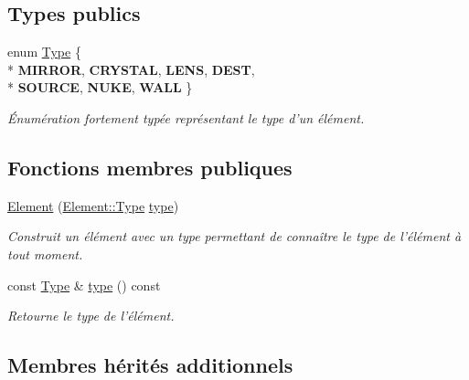 \subsection*{Types publics}
\begin{DoxyCompactItemize}
\item 
\hypertarget{classElement_a009a3be4c3a037a72e292b2464c9cbc5}{enum \hyperlink{classElement_a009a3be4c3a037a72e292b2464c9cbc5}{Type} \{ \\*
{\bfseries M\+I\+R\+R\+O\+R}, 
{\bfseries C\+R\+Y\+S\+T\+A\+L}, 
{\bfseries L\+E\+N\+S}, 
{\bfseries D\+E\+S\+T}, 
\\*
{\bfseries S\+O\+U\+R\+C\+E}, 
{\bfseries N\+U\+K\+E}, 
{\bfseries W\+A\+L\+L}
 \}}\label{classElement_a009a3be4c3a037a72e292b2464c9cbc5}

\begin{DoxyCompactList}\small\item\em Énumération fortement typée représentant le type d'un élément. \end{DoxyCompactList}\end{DoxyCompactItemize}
\subsection*{Fonctions membres publiques}
\begin{DoxyCompactItemize}
\item 
\hypertarget{classElement_a0715913621e7695aba3b04d4d5fd140d}{\hyperlink{classElement_a0715913621e7695aba3b04d4d5fd140d}{Element} (\hyperlink{classElement_a009a3be4c3a037a72e292b2464c9cbc5}{Element\+::\+Type} \hyperlink{classElement_a4c4d133a897618ffc6fe397b18593bc2}{type})}\label{classElement_a0715913621e7695aba3b04d4d5fd140d}

\begin{DoxyCompactList}\small\item\em Construit un élément avec un type permettant de connaître le type de l'élément à tout moment. \end{DoxyCompactList}\item 
const \hyperlink{classElement_a009a3be4c3a037a72e292b2464c9cbc5}{Type} \& \hyperlink{classElement_a4c4d133a897618ffc6fe397b18593bc2}{type} () const 
\begin{DoxyCompactList}\small\item\em Retourne le type de l'élément. \end{DoxyCompactList}\end{DoxyCompactItemize}
\subsection*{Membres hérités additionnels}


